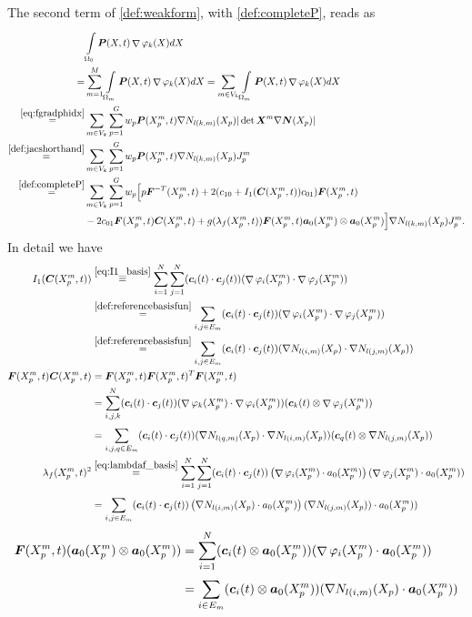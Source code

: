 \documentclass[a4paper,12pt]{article}
\newcommand{\Or}{\Omega_0}
\newcommand{\intor}{\intl{\Or}{}}
\DeclareMathOperator{\divergence}{\nabla}
\newcommand{\sumgp}{\suml{p=1}{G}}
\newcommand{\jmp}{J^m_p}
\newcommand{\re}[1]{\stackrel{\eqref{#1}}{=}}
\newcommand{\sumvk}{\suml{m\in V_k}{}}
\newcommand{\pmp}{X^m_p}%
\begin{document}
The second term of \eqref{def:weakform}, with \eqref{def:completeP}, reads as
\begin{align*}
		&\intor\vP(X,t)\divergence\varphi_k(X) dX\\
		=& \suml{m=1}{M}\intl{\Omega_m}{}\vP(X,t)\divergence\varphi_k(X) dX
			= \sumvk\intl{\Omega_m}{}\vP(X,t)\divergence\varphi_k(X) dX\\
		\re{eq:fgradphidx}&\sumvk\sumgp w_p\vP(\pmp,t)\nabla N_{l(k,m)}(X_p)|\det \vX^m\nabla\vN(X_p)|\\
		\re{def:jacshorthand}&\sumvk\sumgp w_p\vP(\pmp,t)\nabla N_{l(k,m)}(X_p)\jmp\\
		\re{def:completeP}&\sumvk\sumgp w_p\Bigl[p\vF^{-T}(\pmp,t) + 2(c_{10} + I_1(\vC(\pmp,t))c_{01})\vF(\pmp,t)\\
			 &- 2c_{01}\vF(\pmp,t)\vC(\pmp,t)+g(\lambda_f(\pmp,t))\vF(\pmp,t)\va_0(\pmp)\otimes\va_0(\pmp)\Bigr]\nabla N_{l(k,m)}(X_p)\jmp\nonumber.
\end{align*}
In detail we have
\begin{align*}
	I_1(\vC(\pmp,t)) &\re{eq:I1_basis} \sumi\sumj (\vc_i(t) \cdot \vc_j(t))(\divergence\varphi_i(\pmp) \cdot \divergence\varphi_j(\pmp))\\
	&\re{def:referencebasisfun} \suml{i,j\in E_m}{} (\vc_i(t) \cdot \vc_j(t))(\divergence\varphi_i(\pmp) \cdot \divergence\varphi_j(\pmp))\\
	&\re{def:referencebasisfun} \suml{i,j\in E_m}{} (\vc_i(t) \cdot \vc_j(t))(\nabla N_{l(i,m)}(X_p) \cdot \nabla N_{l(j,m)}(X_p))\\
	\vF(\pmp,t)\vC(\pmp,t) &= \vF(\pmp,t)\vF(\pmp,t)^T\vF(\pmp,t)\\
    	&= \suml{i,j,k}{N}(\vc_i(t)\cdot \vc_j(t))(\divergence\varphi_k(\pmp)\cdot\divergence\varphi_i(\pmp))(\vc_k(t)\otimes\divergence\varphi_j(\pmp))\\
    	&= \suml{i,j,q\in E_m}{}(\vc_i(t)\cdot \vc_j(t))(\nabla N_{l(q,m)}(X_p)\cdot\nabla N_{l(i,m)}(X_p))(\vc_q(t)\otimes\nabla N_{l(j,m)}(X_p))\\
    \lambda_f(\pmp,t)^2 &\re{eq:lambdaf_basis}
    		\sumi\sumj (\vc_i(t)\cdot \vc_j(t))\left(\divergence\varphi_i(\pmp)\cdot a_0(\pmp)\right)(\divergence\varphi_j(\pmp)\cdot a_0(\pmp))\nonumber\\
    	&= \suml{i,j\in E_m}{} (\vc_i(t)\cdot \vc_j(t))\left(\nabla N_{l(i,m)}(X_p)\cdot a_0(\pmp)\right)(\nabla N_{l(j,m)}(X_p))\cdot a_0(\pmp))\nonumber
\end{align*} 
\begin{align*}  	
    \vF(\pmp,t)(\va_0(\pmp)\otimes\va_0(\pmp)) 
    	&= \sumi (\vc_i(t)\otimes \va_0(\pmp))(\divergence\varphi_i(\pmp)\cdot\va_0(\pmp))\nonumber\\
    	&= \suml{i\in E_m}{} (\vc_i(t)\otimes \va_0(\pmp))(\nabla N_{l(i,m)}(X_p)\cdot\va_0(\pmp))\nonumber
\end{align*}
\end{document}

